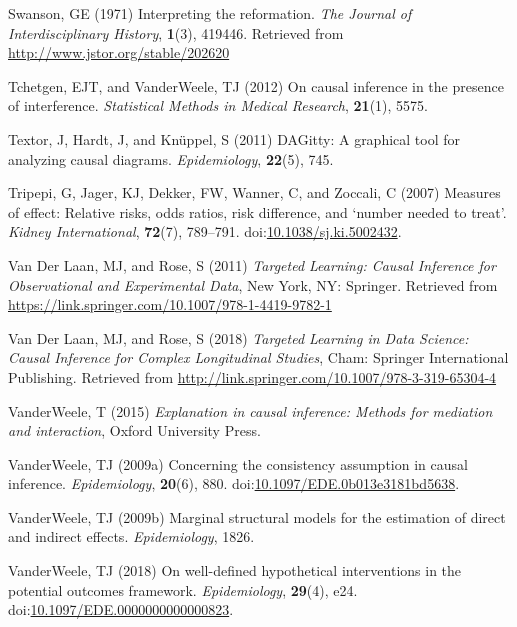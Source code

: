 \documentclass[
  singlecolumn,
  9pt]{article}
\begin{document}
\begin{CSLReferences}
Swanson, GE (1971) Interpreting the reformation. \emph{The Journal of
Interdisciplinary History}, \textbf{1}(3), 419446. Retrieved from
\url{http://www.jstor.org/stable/202620}

Tchetgen, EJT, and VanderWeele, TJ (2012) On causal inference in the
presence of interference. \emph{Statistical Methods in Medical
Research}, \textbf{21}(1), 5575.

Textor, J, Hardt, J, and Knüppel, S (2011) DAGitty: A graphical tool for
analyzing causal diagrams. \emph{Epidemiology}, \textbf{22}(5), 745.

Tripepi, G, Jager, KJ, Dekker, FW, Wanner, C, and Zoccali, C (2007)
Measures of effect: Relative risks, odds ratios, risk difference, and
{`}number needed to treat{'}. \emph{Kidney International},
\textbf{72}(7), 789--791.
doi:\href{https://doi.org/10.1038/sj.ki.5002432}{10.1038/sj.ki.5002432}.

Van Der Laan, MJ, and Rose, S (2011) \emph{Targeted Learning: Causal
Inference for Observational and Experimental Data}, New York, NY:
Springer. Retrieved from
\url{https://link.springer.com/10.1007/978-1-4419-9782-1}

Van Der Laan, MJ, and Rose, S (2018) \emph{Targeted Learning in Data
Science: Causal Inference for Complex Longitudinal Studies}, Cham:
Springer International Publishing. Retrieved from
\url{http://link.springer.com/10.1007/978-3-319-65304-4}

VanderWeele, T (2015) \emph{Explanation in causal inference: Methods for
mediation and interaction}, Oxford University Press.

VanderWeele, TJ (2009a) Concerning the consistency assumption in causal
inference. \emph{Epidemiology}, \textbf{20}(6), 880.
doi:\href{https://doi.org/10.1097/EDE.0b013e3181bd5638}{10.1097/EDE.0b013e3181bd5638}.

VanderWeele, TJ (2009b) Marginal structural models for the estimation of
direct and indirect effects. \emph{Epidemiology}, 1826.

VanderWeele, TJ (2018) On well-defined hypothetical interventions in the
potential outcomes framework. \emph{Epidemiology}, \textbf{29}(4), e24.
doi:\href{https://doi.org/10.1097/EDE.0000000000000823}{10.1097/EDE.0000000000000823}.


\end{CSLReferences}
\end{document}
